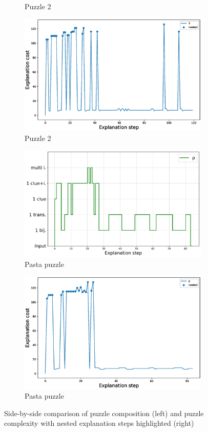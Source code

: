 \begin{figure}[t!]
\begin{subfigure}{.5\textwidth}
				\caption{Puzzle 2}
				\label{fig:composition_puzzle:p2}
		\end{subfigure}%
		\begin{subfigure}{.5\textwidth}
				\centering
				\includegraphics[width=0.84\linewidth]{figures/2.eps}
				\caption{Puzzle 2}
				\label{fig:cost_puzzle:p2}
		\end{subfigure}
		\begin{subfigure}{.5\textwidth}
				\centering
				\includegraphics[width=0.9\linewidth]{figures/plot_cost_steps_p.pdf}
				\caption{Pasta puzzle}
				\label{fig:composition_puzzle:pasta}
		\end{subfigure}%
		\begin{subfigure}{.5\textwidth}
				\centering
				\includegraphics[width=0.84\linewidth]{figures/p.eps}
				\caption{Pasta puzzle}
				\label{fig:cost_puzzle:pasta}
		\end{subfigure}
		\caption{Side-by-side comparison of puzzle composition (left) and puzzle complexity with nested explanation steps highlighted (right)}
		\label{fig:steps}
\end{figure}

